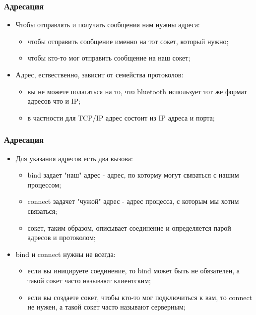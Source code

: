 \begin{frame}
\frametitle{Адресация}
\begin{itemize}
  \item<1-> Чтобы отправлять и получать сообщения нам нужны адреса:
    \begin{itemize}
      \item чтобы отправить сообщение именно на тот сокет, который нужно;
      \item чтобы кто-то мог отправить сообщение на наш сокет;
    \end{itemize}
  \item<2-> Адрес, ествественно, зависит от семейства протоколов:
    \begin{itemize}
      \item вы не можете полагаться на то, что bluetooth использует тот же формат адресов что и IP;
      \item в частности для TCP/IP адрес состоит из IP адреса и порта;
    \end{itemize}
\end{itemize}
\end{frame}

\begin{frame}
\frametitle{Адресация}
\begin{itemize}
  \item<1-> Для указания адресов есть два вызова:
    \begin{itemize}
      \item bind задает "наш" адрес - адрес, по которму могут связаться с нашим процессом;
      \item connect задачет "чужой" адрес - адрес процесса, с которым мы хотим связаться;
      \item сокет, таким образом, описывает соединение и определяется парой адресов и протоколом;
    \end{itemize}
  \item<2-> bind и connect нужны не всегда:
    \begin{itemize}
      \item если вы иницируете соединение, то bind может быть не обязателен, а такой сокет часто называют клиентским;
      \item если вы создаете сокет, чтобы кто-то мог подключиться к вам, то connect не нужен, а такой сокет часто называют серверным;
    \end{itemize}
\end{itemize}
\end{frame}

